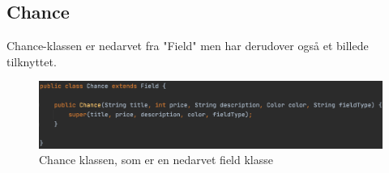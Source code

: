 \subsection{Chance}
Chance-klassen er nedarvet fra "Field" men har derudover også et billede tilknyttet.
\begin{figure}[H]
    \centering
    \includegraphics{sources/7_implementering/ChanceField.png}
    \caption{Chance klassen, som er en nedarvet field klasse}
    \label{fig:ChanceField}
\end{figure}